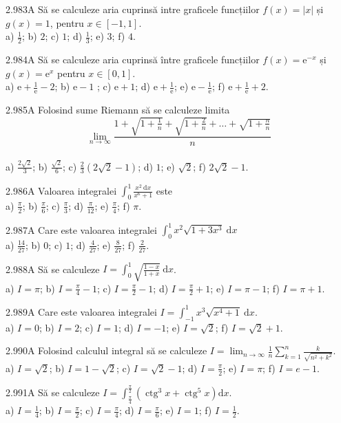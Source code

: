 \documentclass[11pt]{article}
\begin{document}
2.983A Să se calculeze aria cuprinsă intre graficele funcțiilor $f(x)=|x|$ și $g(x)=1$, pentru $x \in[-1,1]$.\\ a) $\frac{1}{2}$; b) $2$; c) $1$; d) $\frac{1}{3}$; e) $3$; f) $4$.

2.984A Să se calculeze aria cuprinsă între graficele funcțiilor $f(x)=\mathrm{e}^{-x}$ și $g(x)=\mathrm{e}^{x}$ pentru $x \in[0,1]$.\\ a) $\mathrm{e}+\frac{1}{\mathrm{e}}-2$; b) $\mathrm{e}-1$ ; c) $\mathrm{e}+1$; d) $\mathrm{e}+\frac{1}{\mathrm{e}}$; e) $\mathrm{e}-\frac{1}{\mathrm{e}}$; f) $\mathrm{e}+\frac{1}{\mathrm{e}}+2$.

2.985A Folosind sume Riemann să se calculeze limita $$\lim _{n \rightarrow \infty} \frac{1+\sqrt{1+\frac{1}{n}}+\sqrt{1+\frac{2}{n}}+\ldots+\sqrt{1+\frac{n}{n}}}{n}$$\\ a) $\frac{2 \sqrt{2}}{3}$; b) $\frac{\sqrt{2}}{6}$; c) $\frac{2}{3}(2 \sqrt{2}-1)$; d) $1$; e) $\sqrt{2}$; f) $2 \sqrt{2}-1$.

2.986A Valoarea integralei $\int_{0}^{1} \frac{x^{2} \mathrm{~d} x}{x^{6}+1}$ este\\ a) $\frac{\pi}{2}$; b) $\frac{\pi}{6}$; c) $\frac{\pi}{3}$; d) $\frac{\pi}{12}$; e) $\frac{\pi}{4}$; f) $\pi$.

2.987A Care este valoarea integralei $\int_{0}^{1} x^{2} \sqrt{1+3 x^{3}} \mathrm{~d} x$\\ a) $\frac{14}{27}$; b) $0$; c) $1$; d) $\frac{4}{27}$; e) $\frac{8}{27}$; f) $\frac{2}{27}$.

2.988A Să se calculeze $I=\int_{0}^{1} \sqrt{\frac{1-x}{1+x}} \mathrm{~d} x$.\\ a) $I=\pi$; b) $I=\frac{\pi}{4}-1$; c) $I=\frac{\pi}{2}-1$; d) $I=\frac{\pi}{2}+1$; e) $I=\pi-1$; f) $I=\pi+1$.

2.989A Care este valoarea integralei $I=\int_{-1}^{1} x^{3} \sqrt{x^{4}+1} \mathrm{~d} x$.\\ a) $I=0$; b) $I=2$; c) $I=1$; d) $I=-1$; e) $I=\sqrt{2}$; f) $I=\sqrt{2}+1$.

2.990A Folosind calculul integral să se calculeze $I=\lim _{n \rightarrow \infty} \frac{1}{n} \sum_{k=1}^{n} \frac{k}{\sqrt{n^{2}+k^{2}}}$.\\ a) $I=\sqrt{2}$; b) $I=1-\sqrt{2}$; c) $I=\sqrt{2}-1$; d) $I=\frac{\pi}{2}$; e) $I=\pi$; f) $I=e-1$.

2.991A Să se calculeze $I=\int_{\frac{\pi}{4}}^{\frac{\pi}{2}}\left(\operatorname{ctg}^{3} x+\operatorname{ctg}^{5} x\right) \mathrm{d} x$.\\ a) $I=\frac{1}{4}$; b) $I=\frac{\pi}{2}$; c) $I=\frac{\pi}{4}$; d) $I=\frac{\pi}{6}$; e) $I=1$; f) $I=\frac{1}{2}$.
\end{document}

